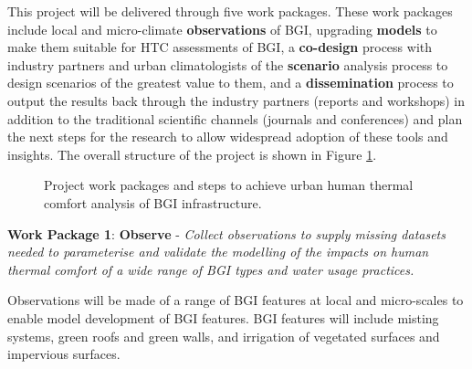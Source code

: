This project will be delivered through five work packages. These work packages include local and micro-climate \textbf{observations} of BGI, upgrading \textbf{models} to make them suitable for HTC assessments of BGI, a \textbf{co-design} process with industry partners and urban climatologists of the \textbf{scenario} analysis process to design scenarios of the greatest value to them, and a \textbf{dissemination} process to output the results back through the industry partners (reports and workshops) in addition to the traditional scientific channels (journals and conferences) and plan the next steps for the research to allow widespread adoption of these tools and insights. The overall structure of the project is shown in Figure \ref{fig:overall}.


\begin{figure}[ht]
\begin{center}
\end{center}
\caption{Project work packages and steps to achieve urban human thermal comfort analysis of BGI infrastructure.}
\label{fig:overall}
\end{figure}



\textbf{Work Package 1}: \textbf{Observe} - \emph{Collect observations to supply missing datasets needed to parameterise and validate the modelling of the impacts on human thermal comfort of a wide range of BGI types and water usage practices.}

Observations will be made of a range of BGI features at local and micro-scales to enable model development of BGI features. BGI features will include misting systems, green roofs and green walls, and irrigation of vegetated surfaces and impervious surfaces. 

